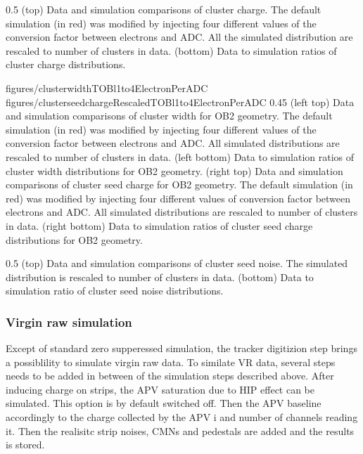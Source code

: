                  {0.5}       %
                 { (top) Data and simulation comparisons of cluster charge. The default simulation (in red) was modified by injecting four different values of the conversion factor between electrons and ADC. All the simulated distribution are rescaled to number of clusters in data. (bottom) Data to simulation ratios of cluster charge distributions. }

                 {figures/clusterwidthTOBl1to4ElectronPerADC}
                 {figures/clusterseedchargeRescaledTOBl1to4ElectronPerADC} %
                 {0.45}       %
                 {(left top) Data and simulation  comparisons of cluster width for OB2 geometry. The default simulation (in red) was modified by injecting four different values of the conversion factor between electrons and ADC. All simulated distributions are rescaled to number of clusters in data. (left bottom) Data to simulation ratios of cluster width distributions for OB2 geometry. (right top) Data and simulation  comparisons of cluster seed charge for OB2 geometry. The default simulation (in red) was modified by injecting four different values of conversion factor between electrons and ADC. All simulated distributions are rescaled to number of clusters in data. (right bottom) Data to simulation ratios of cluster seed charge distributions for OB2 geometry. }

                 {0.5}       %
                 { (top) Data and simulation comparisons of cluster seed noise. The simulated distribution is rescaled to number of clusters in data. (bottom) Data to simulation ratio of cluster seed noise distributions. }

 
\subsubsection{Virgin raw simulation}

Except of standard zero supperessed simulation, the tracker digitizion step brings a possiblility to simulate virgin raw data. To similate VR data, several steps needs to be added in between of the simulation steps described above. After inducing charge on strips, the APV saturation due to HIP effect can be simulated. This option is by default switched off. Then the APV baseline accordingly to the charge collected by the APV i and number of channels reading it. Then the realisitc strip noises, CMNs and pedestals are added and the results is stored.

